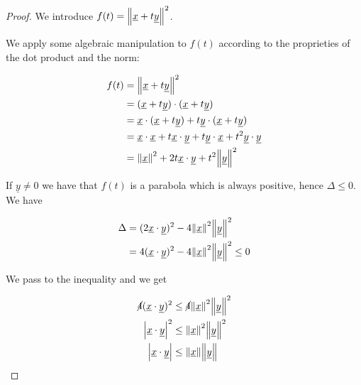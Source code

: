 \documentclass[10pt]{extarticle}
\begin{document}
\begin{proof}
    We introduce $f(t) = \norm{\underline{x} + t \underline{y}}^2$.

    We apply some algebraic manipulation to $f(t)$ according to the proprieties of the dot product and the norm:

    \begin{align*}
        f(t) & = \norm{\underline{x} + t \underline{y}}^2                                                                                                              \\
             & = (\underline{x} + t \underline{y}) \cdot (\underline{x} + t \underline{y})                                                                             \\
             & = \underline{x} \cdot (\underline{x} + t \underline{y}) + t \underline{y} \cdot (\underline{x} + t \underline{y})                                       \\
             & = \underline{x} \cdot \underline{x} + t \underline{x} \cdot \underline{y} + t \underline{y} \cdot \underline{x} + t^2 \underline{y} \cdot \underline{y} \\
             & = \norm{\underline{x}}^2 + 2t \underline{x} \cdot \underline{y} + t^2 \norm{\underline{y}}^2
    \end{align*}

    If $\underline{y} \ne 0$ we have that $f(t)$ is a parabola which is always positive, hence $\Delta \leq 0$. We have

    \begin{align*}
        \Delta & = (2 \underline{x} \cdot \underline{y})^2 - 4 \norm{\underline{x}}^2 \norm{\underline{y}}^2        \\
               & = 4 (\underline{x} \cdot \underline{y})^2 - 4 \norm{\underline{x}}^2 \norm{\underline{y}}^2 \leq 0 \\
    \end{align*}

    We pass to the inequality and we get

    \begin{align*}
        \cancel{4}(\underline{x} \cdot \underline{y})^2 & \leq \cancel{4} \norm{\underline{x}}^2 \norm{\underline{y}}^2 \\
        \abs{\underline{x} \cdot \underline{y}} ^2      & \leq \norm{\underline{x}}^2 \norm{\underline{y}}^2            \\
        \abs{\underline{x} \cdot \underline{y}}         & \leq \norm{\underline{x}} \norm{\underline{y}}
    \end{align*}
\end{proof}
\end{document}
